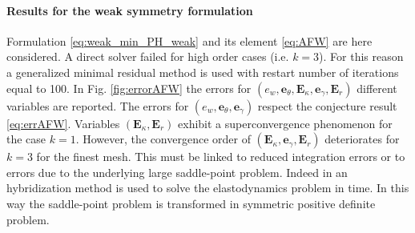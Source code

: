 \documentclass{ifacconf}
\begin{document}
\paragraph{Results for the weak symmetry formulation} 
Formulation \eqref{eq:weak_min_PH_weak} and its element \eqref{eq:AFW} are here considered. A direct solver failed for high order cases (i.e. $k=3$). For this reason a generalized minimal residual method is used with restart number of iterations equal to 100. In Fig. \ref{fig:errorAFW} the errors for $(e_w, \bm{e}_\theta, \bm{E}_\kappa, \bm{e}_\gamma, \bm{E}_r)$ different variables are reported. The errors for $(e_w, \bm{e}_\theta, \bm{e}_\gamma)$ respect the conjecture result \eqref{eq:errAFW}. Variables $(\bm{E}_\kappa, \bm{E}_r)$ exhibit a superconvergence phenomenon for the case $k=1$. However, the convergence order of $(\bm{E}_\kappa, \bm{e}_\gamma, \bm{E}_r)$ deteriorates for $k=3$ for the finest mesh. This must be linked to reduced integration errors or to errors due to the underlying large saddle-point problem. Indeed in \cite{ArnoldWeak} an hybridization method is used to solve the elastodynamics problem in time. In this way the saddle-point problem is transformed in symmetric positive definite problem.
\end{document}
